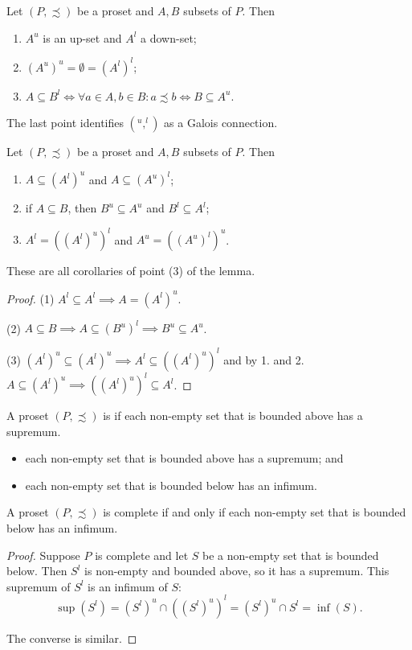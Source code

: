 \begin{lemma}
Let $(P,\precsim)$ be a proset and $A,B$ subsets of $P$. Then
\begin{enumerate}
\item $A^u$ is an up-set and $A^l$ a down-set;
\item $(A^u)^u = \emptyset = (A^l)^l $;
\item $A\subseteq B^l \iff \forall a\in A, b\in B: a\precsim b \iff B\subseteq A^u$.
\end{enumerate}
\end{lemma}
The last point identifies $(^u,^l)$ as a Galois connection.
\begin{corollary}
Let $(P,\precsim)$ be a proset and $A,B$ subsets of $P$. Then
\begin{enumerate}
\item $A\subseteq (A^l)^u$ and $A\subseteq (A^u)^l$;
\item if $A\subseteq B$, then $B^u\subseteq A^u$ and $B^l \subseteq A^l$;
\item $A^l = ((A^l)^u)^l$ and $A^u = ((A^u)^l)^u$.
\end{enumerate}
\end{corollary}
These are all corollaries of point (3) of the lemma.
\begin{proof}
(1) $A^l \subseteq A^l \implies A = (A^l)^u$.

(2) $A\subseteq B \implies A \subseteq (B^u)^l \implies B^u\subseteq A^u$.

(3) $(A^l)^u \subseteq (A^l)^u \implies A^l \subseteq ((A^l)^u)^l$ and by 1. and 2. $A\subseteq (A^l)^u \implies ((A^l)^u)^l \subseteq A^l$.
\end{proof}

\begin{definition}
A proset $(P,\precsim)$ is  if each non-empty set that is bounded above has a supremum.
\begin{itemize}
\item each non-empty set that is bounded above has a supremum; and
\item each non-empty set that is bounded below has an infimum.
\end{itemize}
\end{definition}

\begin{proposition} \label{prop:existenceSupremaInfima}
A proset $(P,\precsim)$ is complete \textup{if and only if} each non-empty set that is bounded below has an infimum.
\end{proposition}
\begin{proof}
Suppose $P$ is complete and let $S$ be a non-empty set that is bounded below. Then $S^l$ is non-empty and bounded above, so it has a supremum. This supremum of $S^l$ is an infimum of $S$:
\[ \sup(S^l) = (S^l)^u\cap((S^l)^u)^l = (S^l)^u\cap S^l = \inf(S).  \]

The converse is similar.
\end{proof}

